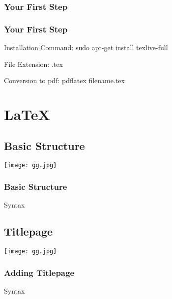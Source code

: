 \documentclass{beamer}
\begin{document}
            \subsubsection{Your First Step}
            \begin{frame}[shrink]
            \frametitle{Your First Step}
            \transfade
                \begin{block}{
                    Installation Command:} sudo apt-get install texlive-full
                \end{block}
                \begin{block}
                    {File Extension:} 
                    .tex
                \end{block}
                \begin{block}{
                    Conversion to pdf:} 
                    pdflatex filename.tex
                \end{block}
            \end{frame}
            
        \section{\LaTeX}

            \subsection{Basic Structure}
            {\texttt{[image: gg.jpg]}}
                \begin{frame}[shrink]
                \frametitle{Basic Structure}
                \transdissolve
                    \begin{block}{Syntax}
                        
                    \end{block}
                \end{frame}

            \subsection{Titlepage}
            {\texttt{[image: gg.jpg]}}
                \begin{frame}[shrink]
                \frametitle{Adding Titlepage}
                \transblindsvertical
                    \begin{block}{Syntax}
                        
                    \end{block}
                \end{frame}
\end{document}
